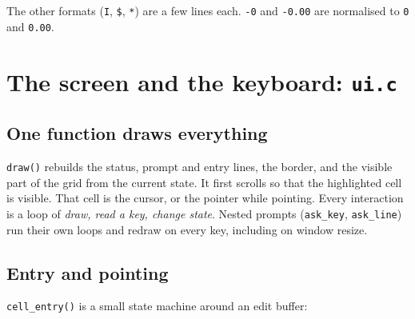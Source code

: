 \documentclass[11pt]{article}
\begin{document}
The other formats (\texttt{I}, \texttt{\$}, \texttt{*}) are a few lines
each. \texttt{-0} and \texttt{-0.00} are normalised to \texttt{0} and
\texttt{0.00}.

\section{The screen and the keyboard: \texttt{ui.c}}

\subsection{One function draws everything}

\texttt{draw()} rebuilds the status, prompt and entry lines, the border,
and the visible part of the grid from the current state. It first scrolls
so that the highlighted cell is visible. That cell is the cursor, or the
pointer while pointing. Every interaction is a loop of \emph{draw, read a
key, change state}. Nested prompts (\texttt{ask\_key}, \texttt{ask\_line})
run their own loops and redraw on every key, including on window resize.

\subsection{Entry and pointing}

\texttt{cell\_entry()} is a small state machine around an edit buffer:

\begin{center}
\end{center}
\end{document}
